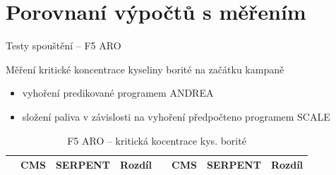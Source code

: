 \documentclass{beamer}
\begin{document}

\section{Porovnaní výpočtů s měřením}


\begin{frame}{Testy spouštění -- F5 ARO}
	
\begin{block}{}\small
	Měření kritické koncentrace kyseliny borité na začátku kampaně
\end{block}

\begin{itemize}\footnotesize
	\item vyhoření predikované programem ANDREA
	\item složení paliva v závislosti na vyhoření předpočteno programem SCALE 
\end{itemize}

\begin{table}[h]\scriptsize
	\begin{center}
		\begin{tabular}{cccc|cccc}
			\toprule
			& CMS     & SERPENT & Rozdíl & & CMS & SERPENT & Rozdíl \\
			\midrule
			
			\bottomrule
		\end{tabular}
		\caption{\footnotesize F5 ARO -- kritická kocentrace kys. borité}
	\end{center}
\end{table}
\end{frame}
\end{document}
